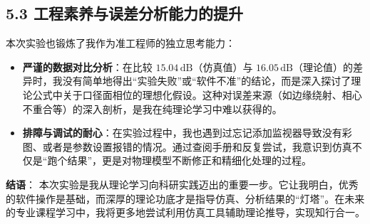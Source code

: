 \documentclass{ctexart}
\begin{document}
\subsection*{5.3 工程素养与误差分析能力的提升}
本次实验也锻炼了我作为准工程师的独立思考能力：
\begin{itemize}
    \item \textbf{严谨的数据对比分析}：在比较 $15.04\,\text{dB}$（仿真值）与 $16.05\,\text{dB}$（理论值）的差异时，我没有简单地得出“实验失败”或“软件不准”的结论，而是深入探讨了理论公式中关于口径面相位的理想化假设。这种对误差来源（如边缘绕射、相心不重合等）的深入剖析，是我在纯理论学习中难以获得的。
    \item \textbf{排障与调试的耐心}：在实验过程中，我也遇到过忘记添加监视器导致没有彩图、或者是参数设置报错的情况。通过查阅手册和反复尝试，我意识到仿真不仅是“跑个结果”，更是对物理模型不断修正和精细化处理的过程。
\end{itemize}

\textbf{结语}：
本次实验是我从理论学习向科研实践迈出的重要一步。它让我明白，优秀的软件操作是基础，而深厚的理论功底才是指导仿真、分析结果的“灯塔”。在未来的专业课程学习中，我将更多地尝试利用仿真工具辅助理论推导，实现知行合一。
\end{document}
